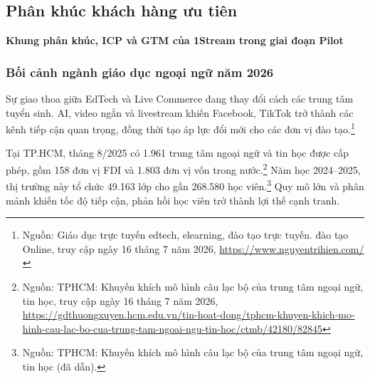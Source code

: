 %
%
%

\subsection{Phân khúc khách hàng ưu tiên}


\textbf{Khung phân khúc, ICP và GTM của 1Stream trong giai đoạn Pilot}

\subsubsection{Bối cảnh ngành giáo dục ngoại ngữ năm 2026}

Sự giao thoa giữa EdTech và Live Commerce đang thay đổi cách các trung tâm tuyển sinh. AI, video ngắn và livestream khiến Facebook, TikTok trở thành các kênh tiếp cận quan trọng, đồng thời tạo áp lực đổi mới cho các đơn vị đào tạo.\footnote{Nguồn: Giáo dục trực tuyến edtech, elearning, đào tạo trực tuyến. đào tạo Online, truy cập ngày 16 tháng 7 năm 2026, \url{https://www.nguyentrihien.com/}}

Tại TP.HCM, tháng 8/2025 có 1.961 trung tâm ngoại ngữ và tin học được cấp phép, gồm 158 đơn vị FDI và 1.803 đơn vị vốn trong nước.\footnote{Nguồn: TPHCM: Khuyến khích mô hình câu lạc bộ của trung tâm ngoại ngữ, tin học, truy cập ngày 16 tháng 7 năm 2026, \url{https://gdthuongxuyen.hcm.edu.vn/tin-hoat-dong/tphcm-khuyen-khich-mo-hinh-cau-lac-bo-cua-trung-tam-ngoai-ngu-tin-hoc/ctmb/42180/82845}} Năm học 2024--2025, thị trường này tổ chức 49.163 lớp cho gần 268.580 học viên.\footnote{Nguồn: TPHCM: Khuyến khích mô hình câu lạc bộ của trung tâm ngoại ngữ, tin học (đã dẫn).} Quy mô lớn và phân mảnh khiến tốc độ tiếp cận, phản hồi học viên trở thành lợi thế cạnh tranh.

